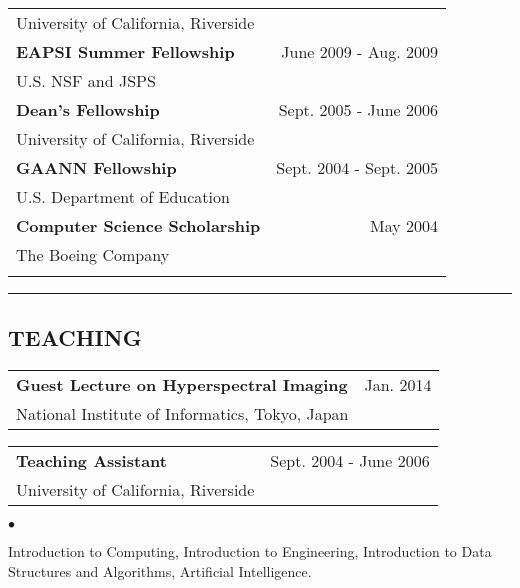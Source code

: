 \documentclass[letterpaper,10pt]{article}
\newcommand{\myline}{ \rule{\textwidth}{0.01in} }
\newenvironment{smallitemize}{
  \begin{list}{$\bullet$}{
    \setlength{\leftmargin}{3.5em}
        \setlength{\topmargin}{-1.0em}
    \setlength{\itemsep}{-0.10em}
    \setlength{\parskip}{-0.8em}
    \setlength{\parsep}{0.10em}
  }
}{
  \end{list}
}
\renewcommand{\bf}{\bfseries}
\begin{document}
\begin{tabularx}{\textwidth}{b{}r}
        {University of California, Riverside} & {} \\ \vspace{0.05in}
\bfseries{EAPSI Summer Fellowship} & {June 2009 - Aug. 2009} \\
        {U.S. NSF and JSPS} & {} \\ \vspace{0.05in}
\bfseries{Dean's Fellowship} & {Sept. 2005 - June 2006} \\
        {University of California, Riverside} & {} \\ \vspace{0.05in}
\bfseries{GAANN Fellowship} & {Sept. 2004 - Sept. 2005} \\
        {U.S. Department of Education} & {} \\ \vspace{0.05in}
\bfseries{Computer Science Scholarship} & {May 2004} \\
        {The Boeing Company} & {} \\ \vspace{0.05in}
\end{tabularx}

\myline
\subsection*{TEACHING}
\begin{tabularx}{\textwidth}{b{}r}
        \bf{Guest Lecture on Hyperspectral Imaging} & Jan. 2014\\
        {National Institute of Informatics, Tokyo, Japan} &\\
\end{tabularx}

\begin{tabularx}{\textwidth}{b{}r}
        \bf{Teaching Assistant} & Sept. 2004 - June 2006\\
        {University of California, Riverside} &\\
\end{tabularx}
\begin{smallitemize} \normalfont
        \item Introduction to Computing, Introduction to Engineering, Introduction to Data Structures and Algorithms, Artificial Intelligence.
\end{smallitemize}
\end{document}

